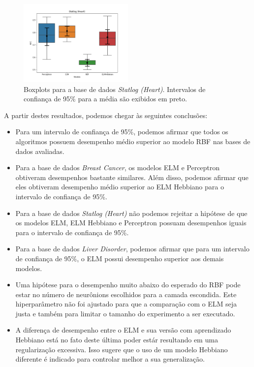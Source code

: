 \documentclass[conference]{IEEEtran}
\begin{document}
	
	\begin{figure}[thpbh]
		\centering
		\includegraphics[width=0.5\textwidth]{figures/Statlog (Heart)_scores.png}
		\caption{Boxplots para a base de dados \textit{Statlog (Heart)}. Intervalos de confiança de 95\% para a média são exibidos em preto.}
		\label{fig:box-statlog-heart}
	\end{figure}
	
	A partir destes resultados, podemos chegar às seguintes conclusões:
	\begin{itemize}
		\item Para um intervalo de confiança de 95\%, podemos afirmar que todos os algoritmos possuem desempenho médio superior ao modelo RBF nas bases de dados avaliadas.
		\item Para a base de dados \textit{Breast Cancer}, os modelos ELM e Perceptron obtiveram desempenhos bastante similares. Além disso, podemos afirmar que eles obtiveram desempenho médio superior ao ELM Hebbiano para o intervalo de confiança de 95\%.
		\item Para a base de dados \textit{Statlog (Heart)} não podemos rejeitar a hipótese de que os modelos ELM, ELM Hebbiano e Perceptron possuam desempenhos iguais para o intervalo de confiança de 95\%.
		\item Para a base de dados \textit{Liver Disorder}, podemos afirmar que para um intervalo de confiança de 95\%, o ELM possui desempenho superior aos demais modelos.
		\item Uma hipótese para o desempenho muito abaixo do esperado do RBF pode estar no número de neurônions escolhidos para a camada escondida. Este hiperparâmetro não foi ajustado para que a comparação com o ELM seja justa e também para limitar o tamanho do experimento a ser executado. 
		\item A diferença de desempenho entre o ELM e sua versão com aprendizado Hebbiano está no fato deste última poder estár resultando em uma regularização excessiva. Isso sugere que o uso de um modelo Hebbiano diferente é indicado para controlar melhor a sua generalização.
	\end{itemize}
\end{document}
